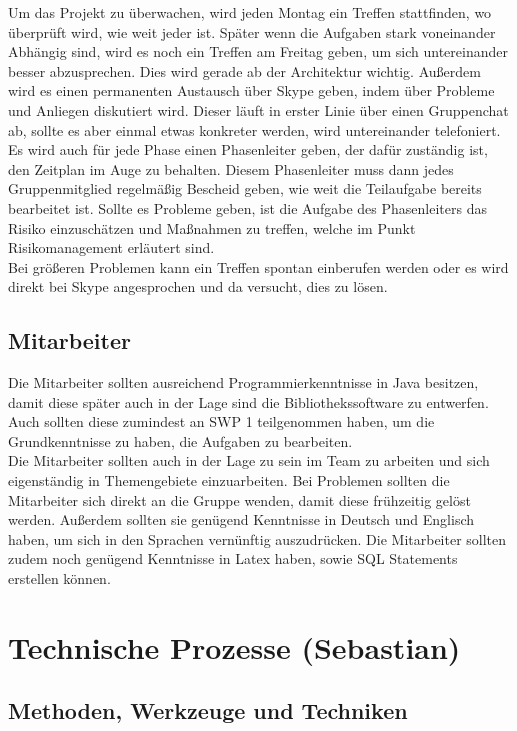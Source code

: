 \documentclass[fontsize=12pt,paper=a4,twoside]{scrartcl}
\begin{document}
Um das Projekt zu überwachen, wird jeden Montag ein Treffen stattfinden, wo überprüft wird, wie weit jeder ist. Später wenn die Aufgaben stark voneinander Abhängig sind, wird es noch ein Treffen am Freitag geben, um sich untereinander besser abzusprechen. Dies wird gerade ab der Architektur wichtig. Außerdem wird es einen permanenten Austausch über Skype geben, indem über Probleme und Anliegen diskutiert wird. Dieser läuft in erster Linie über einen Gruppenchat ab, sollte es aber einmal etwas konkreter werden, wird untereinander telefoniert. \\
Es wird auch für jede Phase einen Phasenleiter geben, der dafür zuständig ist, den Zeitplan im Auge zu behalten. Diesem Phasenleiter muss dann jedes Gruppenmitglied regelmäßig Bescheid geben, wie weit die Teilaufgabe bereits bearbeitet ist. Sollte es Probleme geben, ist die Aufgabe des Phasenleiters das Risiko einzuschätzen und Maßnahmen zu treffen, welche im Punkt Risikomanagement erläutert sind.\\
Bei größeren Problemen kann ein Treffen spontan einberufen werden oder es wird direkt bei Skype angesprochen und da versucht, dies zu lösen.

\subsection{Mitarbeiter}

Die Mitarbeiter sollten ausreichend Programmierkenntnisse in Java besitzen, damit diese später auch in der Lage sind die Bibliothekssoftware zu entwerfen. Auch sollten diese zumindest an SWP 1 teilgenommen haben, um die Grundkenntnisse zu haben, die Aufgaben zu bearbeiten. \\
Die Mitarbeiter sollten auch in der Lage zu sein im Team zu arbeiten und sich eigenständig in Themengebiete einzuarbeiten. Bei Problemen sollten die Mitarbeiter sich direkt an die Gruppe wenden, damit diese frühzeitig gelöst werden. Außerdem sollten sie genügend Kenntnisse in Deutsch und Englisch haben, um sich in den Sprachen vernünftig auszudrücken. Die Mitarbeiter sollten zudem noch genügend Kenntnisse in Latex haben, sowie SQL Statements erstellen können. 


\section{Technische Prozesse (Sebastian)}
\subsection{Methoden, Werkzeuge und Techniken}
\end{document}
